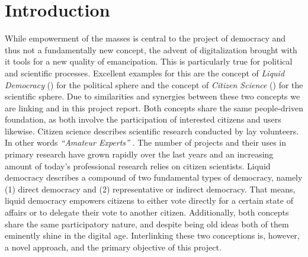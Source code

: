 \chapter{Introduction}
\label{ch:Introduction}


While empowerment of the masses is central to the project of democracy and thus not a fundamentally new concept, the advent of digitalization brought with it tools for a new quality of emancipation. This is particularly true for political and scientific processes. Excellent examples for this are the concept of \textit{Liquid Democracy} () for the political sphere and the concept of \textit{Citizen Science} () for the scientific sphere. Due to similarities and synergies between these two concepts we are linking  and  in this project report. Both concepts share the same people-driven foundation, as both involve the participation of interested citizens and users likewise. Citizen science describes scientific research conducted by lay volunteers. In other words \textit{“Amateur Experts”}  \parencite{Gura2013}. The number of  projects and their uses in primary research have grown rapidly over the last years \parencite{Kosmala2016} and an increasing amount of today’s professional research relies on citizen scientists. Liquid democracy describes a compound of two fundamental types of democracy, namely (1) direct democracy and (2) representative or indirect democracy. That means, liquid democracy empowers citizens to either vote directly for a certain state of affairs or to  delegate their vote to another citizen. Additionally, both concepts share the same participatory nature, and despite being old ideas both of them eminently shine in the digital age. Interlinking these two conceptions is, however, a novel approach, and the primary objective of this project.


